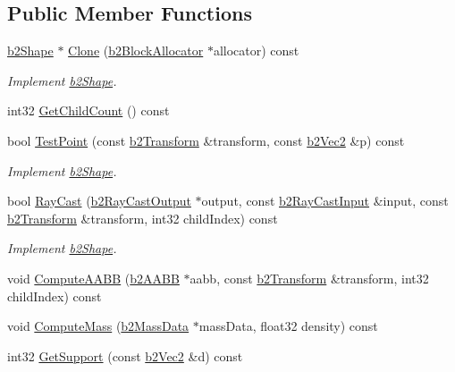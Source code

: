\subsection*{Public Member Functions}
\begin{DoxyCompactItemize}
\item 
\hypertarget{classb2_circle_shape_a895ba8656a146d26a0c531e9dbea2e14}{\hyperlink{classb2_shape}{b2\-Shape} $\ast$ \hyperlink{classb2_circle_shape_a895ba8656a146d26a0c531e9dbea2e14}{Clone} (\hyperlink{classb2_block_allocator}{b2\-Block\-Allocator} $\ast$allocator) const }\label{classb2_circle_shape_a895ba8656a146d26a0c531e9dbea2e14}

\begin{DoxyCompactList}\small\item\em Implement \hyperlink{classb2_shape}{b2\-Shape}. \end{DoxyCompactList}\item 
int32 \hyperlink{classb2_circle_shape_a64b58799675edc9a6debc09c0d6ddce4}{Get\-Child\-Count} () const 
\item 
\hypertarget{classb2_circle_shape_a77171941cd1633c337fed1efb366bebb}{bool \hyperlink{classb2_circle_shape_a77171941cd1633c337fed1efb366bebb}{Test\-Point} (const \hyperlink{structb2_transform}{b2\-Transform} \&transform, const \hyperlink{structb2_vec2}{b2\-Vec2} \&p) const }\label{classb2_circle_shape_a77171941cd1633c337fed1efb366bebb}

\begin{DoxyCompactList}\small\item\em Implement \hyperlink{classb2_shape}{b2\-Shape}. \end{DoxyCompactList}\item 
\hypertarget{classb2_circle_shape_a76175079381193917026fdf3702190fa}{bool \hyperlink{classb2_circle_shape_a76175079381193917026fdf3702190fa}{Ray\-Cast} (\hyperlink{structb2_ray_cast_output}{b2\-Ray\-Cast\-Output} $\ast$output, const \hyperlink{structb2_ray_cast_input}{b2\-Ray\-Cast\-Input} \&input, const \hyperlink{structb2_transform}{b2\-Transform} \&transform, int32 child\-Index) const }\label{classb2_circle_shape_a76175079381193917026fdf3702190fa}

\begin{DoxyCompactList}\small\item\em Implement \hyperlink{classb2_shape}{b2\-Shape}. \end{DoxyCompactList}\item 
void \hyperlink{classb2_circle_shape_aa6889a5af85aa1e272547fd0008eb64a}{Compute\-A\-A\-B\-B} (\hyperlink{structb2_a_a_b_b}{b2\-A\-A\-B\-B} $\ast$aabb, const \hyperlink{structb2_transform}{b2\-Transform} \&transform, int32 child\-Index) const 
\item 
void \hyperlink{classb2_circle_shape_a335edea2ef84789e102dde41ca889828}{Compute\-Mass} (\hyperlink{structb2_mass_data}{b2\-Mass\-Data} $\ast$mass\-Data, float32 density) const 
\item 
\hypertarget{classb2_circle_shape_a8644ce19547e5efaf43bd8ec543e284e}{int32 \hyperlink{classb2_circle_shape_a8644ce19547e5efaf43bd8ec543e284e}{Get\-Support} (const \hyperlink{structb2_vec2}{b2\-Vec2} \&d) const }\label{classb2_circle_shape_a8644ce19547e5efaf43bd8ec543e284e}


\end{DoxyCompactItemize}
